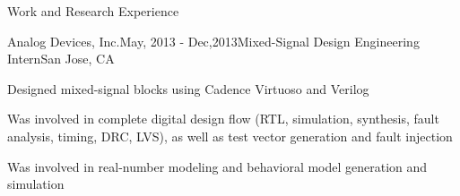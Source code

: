 \begin{rSection} {Work and Research Experience}
  \begin{rSubsection}{Analog Devices, Inc.}{May, 2013 - Dec,2013}{Mixed-Signal Design Engineering Intern}{San Jose, CA}
  \item Designed mixed-signal blocks using Cadence Virtuoso and Verilog
  \item Was involved in complete digital design flow (RTL, simulation, synthesis, fault analysis, timing, DRC, LVS), as well as test vector generation and fault injection
  \item Was involved in real-number modeling and behavioral model generation and simulation
  \end{rSubsection}
\end{rSection}
